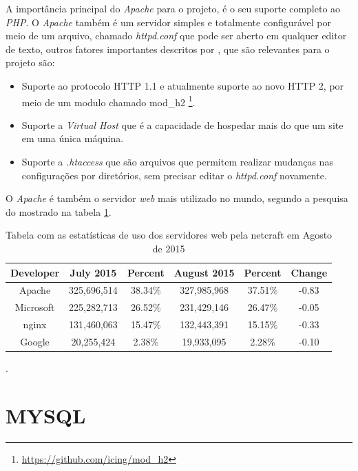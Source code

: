 A importância principal do \textit{Apache} para o projeto, é o seu suporte completo ao \textit{PHP}. O \textit{Apache} também é um servidor simples e totalmente configurável por meio de um arquivo,  chamado \textit{httpd.conf} que pode ser aberto em qualquer editor de texto, outros fatores importantes descritos por \cite[p.~38]{kabir}, que são relevantes para o projeto são:
\begin{itemize}
    \item Suporte ao protocolo HTTP 1.1 e atualmente suporte ao novo HTTP 2, por meio de um modulo chamado mod\_h2 \footnote{\url{https://github.com/icing/mod_h2}}.
    \item Suporte a \textit{Virtual Host} que é a capacidade de hospedar mais do que um site em uma única máquina.
    \item Suporte a \textit{.htaccess} que são arquivos que permitem realizar mudanças nas configurações por diretórios, sem precisar editar o \textit{httpd.conf} novamente.
\end{itemize}

O \textit{Apache} é também o servidor \textit{web} mais utilizado no mundo, segundo a pesquisa do  mostrado na tabela \ref{tbl:netcraft}.

\begin{table}[htp]
	\begin{center}
    \begin{tabular}{|c|c|c|c|c|c|}
        \hline \textbf{Developer} & \textbf{July 2015} & \textbf{Percent} & \textbf{August 2015} & \textbf{Percent} & \textbf{Change} \\
        \hline Apache & 325,696,514 & 38.34\% & 327,985,968 & 37.51\% & -0.83 \\
        \hline Microsoft & 225,282,713 & 26.52\% & 231,429,146 & 26.47\% & -0.05 \\
        \hline nginx & 131,460,063 & 15.47\% & 132,443,391 & 15.15\% & -0.33 \\
        \hline Google & 20,255,424 & 2.38\% & 19,933,095 & 2.28\% & -0.10 \\
        \hline
    \end{tabular}
    \caption{Tabela com as estatísticas de uso dos servidores web pela netcraft em Agosto de 2015}.
    \label{tbl:netcraft}
    \end{center}
\end{table}

\section{MYSQL}
\label{sec:mysql}

